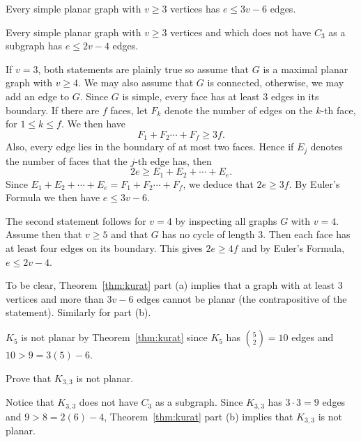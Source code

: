 \begin{thm}
\begin{lenum}
\item 
Every simple planar graph with $v\geq 3$ vertices has  $e \leq
3v-6$ edges. 
\item 
Every simple planar graph with $v\geq 3$ vertices and
which does not have $C_3$ as a subgraph has $e\leq 2v-4$ edges.
\end{lenum}
\label{thm:kurat} %
\begin{pf}
If $v = 3$, both statements are plainly true so assume that  $G$
is a maximal planar graph with $v\geq 4$. We may also assume that
$G$ is connected, otherwise, we may add an edge to $G$. Since $G$
is simple, every face has at least $3$ edges in its boundary. If
there are $f$ faces, let $F_k$ denote the number of edges on the
$k$-th face, for $1 \leq k \leq f$. We then have $$F_1 + F_2
\cdots + F_f \geq 3f.$$ Also, every edge lies in the boundary of
at most two faces. Hence if $E_j$ denotes the number of faces that
the $j$-th edge has, then $$2e  \geq E_1 + E_2 + \cdots + E_e.
$$Since $E_1 + E_2 + \cdots + E_e = F_1 + F_2
\cdots + F_f$, we deduce that $2e \geq 3f$. By Euler's Formula we
then have $e\leq 3v -6$.

\medskip
The second statement follows for $v=4$ by inspecting all graphs
$G$ with $v = 4$. Assume then that $v\geq 5$ and that $G$ has no
cycle of length $3$. Then each face has at least four edges on its
boundary. This gives $2e \geq 4f$ and by Euler's Formula, $e \leq
2v -4$.
\end{pf}
\end{thm}

To be clear, Theorem~\ref{thm:kurat} part (a) implies that a
graph with at least 3 vertices and more than $3v-6$ edges cannot be planar (the contrapositive of the statement).
Similarly for part (b).

\begin{exa}
$K_5$ is not planar by Theorem~\ref{thm:kurat} since
$K_5$ has $\binom{5}{2} = 10$ edges and $10 > 9 = 3(5)-6$.
\end{exa}

\begin{exer}
Prove that $K_{3,3}$ is not planar.

\noindent
\answerlinetwo

\begin{answer}
Notice that $K_{3,3}$ does not have $C_3$ as a subgraph. 
Since $K_{3,3}$ has $3\cdot 3 = 9$ edges and $9 > 8 = 2(6)-4$,
Theorem~\ref{thm:kurat} part (b) implies that $K_{3,3}$ is not planar.
\end{answer}
\end{exer}

